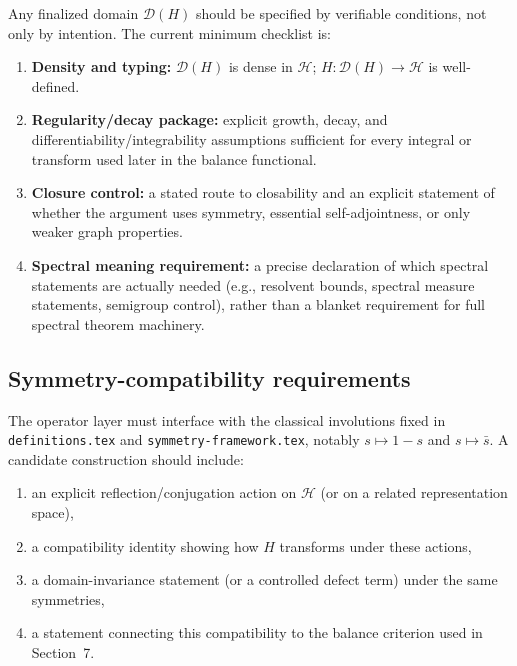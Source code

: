 Any finalized domain $\mathcal{D}(H)$ should be specified by verifiable
conditions, not only by intention. The current minimum checklist is:
\begin{enumerate}
  \item \textbf{Density and typing:} $\mathcal{D}(H)$ is dense in
  $\mathcal{H}$; $H\colon\mathcal{D}(H)\to\mathcal{H}$ is well-defined.
  \item \textbf{Regularity/decay package:} explicit growth, decay, and
  differentiability/integrability assumptions sufficient for every integral or
  transform used later in the balance functional.
  \item \textbf{Closure control:} a stated route to closability and an explicit
  statement of whether the argument uses symmetry, essential self-adjointness,
  or only weaker graph properties.
  \item \textbf{Spectral meaning requirement:} a precise declaration of which
  spectral statements are actually needed (e.g., resolvent bounds, spectral
  measure statements, semigroup control), rather than a blanket requirement for
  full spectral theorem machinery.
\end{enumerate}


\subsection{Symmetry-compatibility requirements}

The operator layer must interface with the classical involutions fixed in
\texttt{definitions.tex} and \texttt{symmetry-framework.tex}, notably
\(s\mapsto 1-s\) and \(s\mapsto \bar s\). A candidate construction should
include:
\begin{enumerate}
  \item an explicit reflection/conjugation action on $\mathcal{H}$ (or on a
  related representation space),
  \item a compatibility identity showing how $H$ transforms under these actions,
  \item a domain-invariance statement (or a controlled defect term) under the
  same symmetries,
  \item a statement connecting this compatibility to the balance criterion used
  in Section~7.
\end{enumerate}

